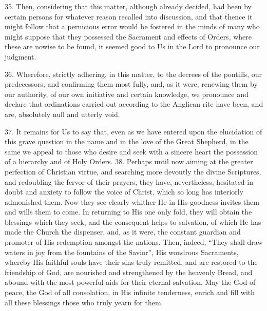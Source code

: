35. Then, considering that this matter, although already decided, had
been by certain persons for whatever reason recalled into discussion,
and that thence it might follow that a pernicious error would be
fostered in the minds of many who might suppose that they possessed the
Sacrament and effects of Orders, where these are nowise to be found, it
seemed good to Us in the Lord to pronounce our judgment.

36. Wherefore, strictly adhering, in this matter, to the decrees of the
pontiffs, our predecessors, and confirming them most fully, and, as it
were, renewing them by our authority, of our own initiative and certain
knowledge, we pronounce and declare that ordinations carried out
according to the Anglican rite have been, and are, absolutely null and
utterly void.

37. It remains for Us to say that, even as we have entered upon the
elucidation of this grave question in the name and in the love of the
Great Shepherd, in the same we appeal to those who desire and seek with
a sincere heart the possession of a hierarchy and of Holy Orders. 38.
Perhaps until now aiming at the greater perfection of Christian virtue,
and searching more devoutly the divine Scriptures, and redoubling the
fervor of their prayers, they have, nevertheless, hesitated in doubt and
anxiety to follow the voice of Christ, which so long has interiorly
admonished them. Now they see clearly whither He in His goodness invites
them and wills them to come. In returning to His one only fold, they
will obtain the blessings which they seek, and the consequent helps to
salvation, of which He has made the Church the dispenser, and, as it
were, the constant guardian and promoter of His redemption amongst the
nations. Then, indeed, ``They shall draw waters in joy from the
fountains of the Savior'', His wondrous Sacraments, whereby His faithful
souls have their sins truly remitted, and are restored to the friendship
of God, are nourished and strengthened by the heavenly Bread, and abound
with the most powerful aids for their eternal salvation. May the God of
peace, the God of all consolation, in His infinite tenderness, enrich
and fill with all these blessings those who truly yearn for them.

